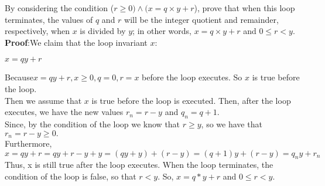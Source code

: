 \documentclass[12pt,a4paper]{article}
\theoremstyle{definition}
\numberwithin{equation}{section}
\numberwithin{figure}{section}
\begin{document}
\begin{enumerate}
\begin{enumerate}
By considering the condition ($r\ge 0) \wedge (x=q \times y+r$), prove that when this loop terminates, the values of $q$ and $r$ will be the integer quotient and remainder, respectively, when $x$ is divided by $y$; in other words, $x=q \times y+r$ and $0 \le r <y$.\\
\textbf{Proof}:We claim that the loop invariant $x$:\\
\begin{center}
	$x = qy + r $
\end{center}
Because$x=qy+r,x \geq 0,q=0,r=x$ before the loop executes. So $x$ is true before the loop.\\
Then we assume that $x$ is true before the loop is executed. Then, after the loop executes, we have the new values $r_n = r - y$ and $q_n = q + 1$.\\
Since, by the condition of the loop we know that $r \geq y$, so we have that $r_n = r - y \geq 0.$\\
Furthermore, $x = qy+r = qy+r-y+y = (qy+y)+(r-y) = (q+1)y+(r-y) = q_ny+r_n$
Thus, x is still true after the loop executes.
When the loop terminates, the condition of the loop is false, so that $r < y$.
So, $x=q*y+r$ and $0 \leq r < y$.

\end{enumerate}
\end{enumerate}
\end{document}
